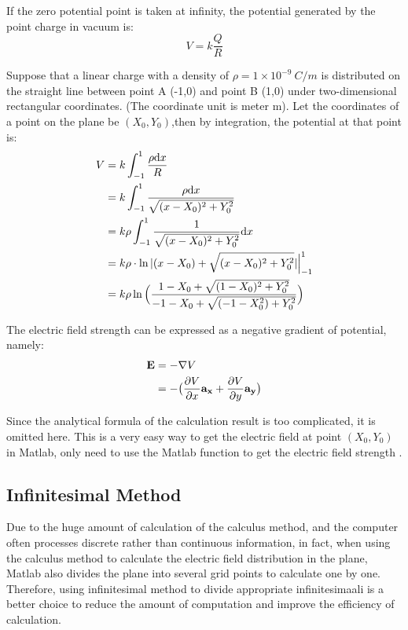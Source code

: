 \documentclass[journal,twocolumn,letterpaper]{IEEEJERM}
\begin{document}
If the zero potential point is taken at infinity, the potential generated by the point charge in vacuum is:
\begin{equation}
V=k\dfrac{Q}{R}
\end{equation}

Suppose that a linear charge with a density of $\rho=1\times10^{-9}\ C/m$ is distributed on the straight line between point A (-1,0) and point B (1,0) under two-dimensional rectangular coordinates. 
(The coordinate unit is meter m). Let the coordinates of a point on the plane be $(X_0,Y_0)$,then by integration, the potential at that point is:
\begin{align}
V&=k\int_{-1}^{1}\dfrac{\rho\mathrm{d}x}{R}  \notag \\
&=k\int_{-1}^1\dfrac{\rho\mathrm{d}x}{\sqrt{(x-X_0)^2+Y_0^2}} \notag \\
&=k\rho\int_{-1}^{1}\dfrac{1}{\sqrt{(x-X_0)^2+Y_0^2}}\mathrm{d}x \notag \\
&=k\rho\cdot\ln|(x-X_0)+\sqrt{(x-X_0)^2+Y_0^2}|\Big|_{-1}^1 \notag \\
&=k\rho\ln\Big( \dfrac{1-X_0+\sqrt{(1-X_0)^2+Y_0^2}}{-1-X_0+\sqrt{(-1-X_0^2)+Y_0^2}} \Big)
\end{align}

The electric field strength can be expressed as a negative gradient of potential, namely:
\begin{align}
\mathbf{E}&=-\nabla{V} \notag \\
&=-\big(\dfrac{\partial V}{\partial x}\mathbf{a_x}+\dfrac{\partial V}{\partial y}\mathbf{a_y}\big)
\end{align}

Since the analytical formula of the calculation result is too complicated, it is omitted here. This is a very easy way to get the electric field at point $(X_0,Y_0)$ in Matlab, only need to use the Matlab function  to get the electric field strength .

\subsection{Infinitesimal Method}
Due to the huge amount of calculation of the calculus method, and the computer often processes discrete rather than continuous information, in fact, when using the calculus method to calculate the electric field distribution in the plane, Matlab also divides the plane into several grid points to calculate one by one. Therefore, using infinitesimal method to divide appropriate infinitesimaali is a better choice to reduce the amount of computation and improve the efficiency of calculation.
\end{document}
